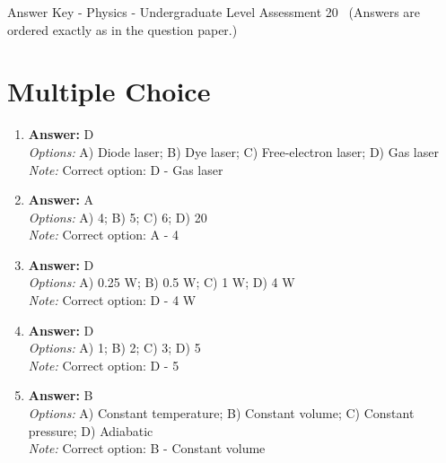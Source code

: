 \documentclass[12pt]{article}
\begin{document}
\begin{center}
Answer Key - Physics - Undergraduate Level Assessment 20 \
\small (Answers are ordered exactly as in the question paper.)
\end{center}

\section*{Multiple Choice}
\begin{enumerate}[label=\arabic*.]
\item \textbf{Answer:} D
\\ \textit{Options:} A) Diode laser; B) Dye laser; C) Free-electron laser; D) Gas laser
\\ \textit{Note:} Correct option: D - Gas laser
\item \textbf{Answer:} A
\\ \textit{Options:} A) 4; B) 5; C) 6; D) 20
\\ \textit{Note:} Correct option: A - 4
\item \textbf{Answer:} D
\\ \textit{Options:} A) 0.25 W; B) 0.5 W; C) 1 W; D) 4 W
\\ \textit{Note:} Correct option: D - 4 W
\item \textbf{Answer:} D
\\ \textit{Options:} A) 1; B) 2; C) 3; D) 5
\\ \textit{Note:} Correct option: D - 5
\item \textbf{Answer:} B
\\ \textit{Options:} A) Constant temperature; B) Constant volume; C) Constant pressure; D) Adiabatic
\\ \textit{Note:} Correct option: B - Constant volume
\end{enumerate}
\end{document}

